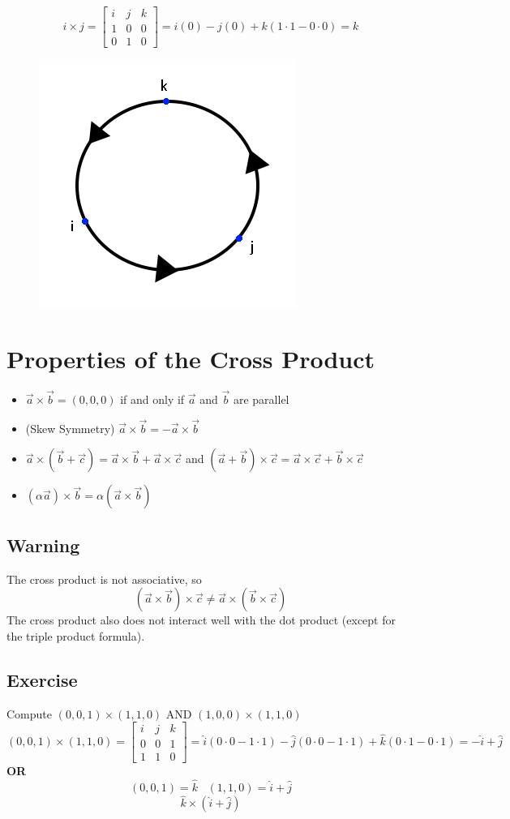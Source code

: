 \documentclass{article}
\begin{document}
\[i\times j=\begin{bmatrix}
    i&j&k\\
    1&0&0\\
    0&1&0
\end{bmatrix}=i(0)−j(0)+k(1⋅1−0⋅0)=k\]
\begin{figure}[h!]
    \centering
    \includegraphics[scale=0.5]{circlesign.png}
    \caption{}
    \label{}
\end{figure}

\section{Properties of the Cross Product}
\begin{itemize}
    \item $\vec{a}\times\vec{b}=(0,0,0)$ if and only if $\vec{a}$ and $\vec{b}$ are parallel
    \item (Skew Symmetry) $\vec{a}\times\vec{b}=-\vec{a}\times\vec{b}$
    \item $\vec{a}\times (\vec{b}+\vec{c})=\vec{a}\times\vec{b}+\vec{a}\times\vec{c}$ and $(\vec{a}+\vec{b})\times\vec{c}=\vec{a}\times\vec{c}+\vec{b}\times\vec{c}$
    \item $(\alpha\vec{a})\times\vec{b}=\alpha(\vec{a}\times\vec{b})$
\end{itemize}
\subsection*{Warning}
The cross product is not associative, so
\[(\vec{a}\times\vec{b})\times\vec{c}\neq\vec{a}\times(\vec{b}\times\vec{c})\]
The cross product also does not interact well with the dot product (except for the triple product formula).
\subsection*{Exercise}
Compute $(0,0,1)\times(1,1,0)$ AND $(1,0,0)\times(1,1,0)$
\[(0,0,1)\times(1,1,0)=\begin{bmatrix}
    i&j&k\\
    0&0&1\\
    1&1&0
\end{bmatrix}=\hat{i}(0\cdot 0-1\cdot 1)-\hat{j}(0\cdot 0-1\cdot 1)+\hat{k}(0\cdot 1-0\cdot 1)=-\hat{i}+\hat{j}\]
\textbf{OR}
\[(0,0,1)=\hat{k}\;\;\;(1,1,0)=\hat{i}+\hat{j}\]
\[\hat{k}\times(\hat{i}+\hat{j})\]
\end{document}

